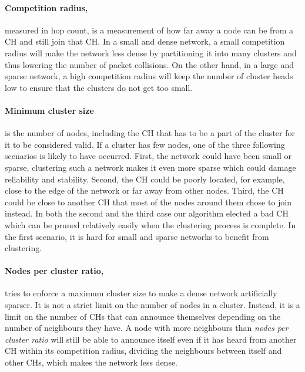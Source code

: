 \paragraph*{Competition radius,} measured in hop count, is a measurement of how far away a node can be from a CH and still join that CH. In a small and dense network, a small competition radius will make the network less dense by partitioning it into many clusters and thus lowering the number of packet collisions. On the other hand, in a large and sparse network, a high competition radius will keep the number of cluster heads low to ensure that the clusters do not get too small. 


\paragraph*{Minimum cluster size} is the number of nodes, including the CH that has to be a part of the cluster for it to be considered valid. If a cluster has few nodes, one of the three following scenarios is likely to have occurred. First, the network could have been small or sparse, clustering such a network makes it even more sparse which could damage reliability and stability. Second, the CH could be poorly located, for example, close to the edge of the network or far away from other nodes. Third, the CH could be close to another CH that most of the nodes around them chose to join instead. In both the second and the third case our algorithm elected a bad CH which can be pruned relatively easily when the clustering process is complete. In the first scenario, it is hard for small and sparse networks to benefit from clustering.


\paragraph*{Nodes per cluster ratio,} tries to enforce a maximum cluster size to make a dense network artificially sparser. It is not a strict limit on the number of nodes in a cluster. Instead, it is a limit on the number of CHs that can announce themselves depending on the number of neighbours they have. A node with more neighbours than \emph{nodes per cluster ratio} will still be able to announce itself even if it has heard from another CH within its competition radius, dividing the neighbours between itself and other CHs, which makes the network less dense.



